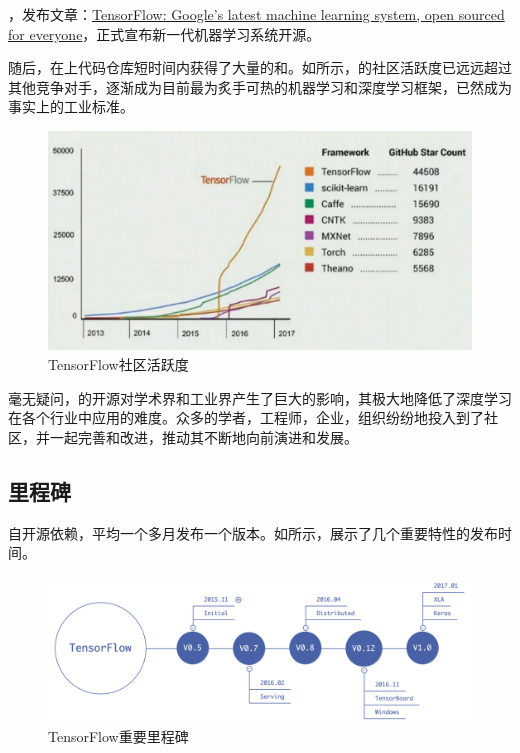 \begin{content}

，发布文章：\href{https://research.googleblog.com/2015/11/tensorflow-googles-latest-machine\_9.html}{TensorFlow: Google's latest machine learning system, open sourced for everyone}，正式宣布新一代机器学习系统开源。

随后，在上代码仓库短时间内获得了大量的和。如所示，的社区活跃度已远远超过其他竞争对手，逐渐成为目前最为炙手可热的机器学习和深度学习框架，已然成为事实上的工业标准。

\begin{figure}[!htbp]
\centering
\includegraphics[width=1.0\textwidth]{figures/tf-commits.png}
\caption{TensorFlow社区活跃度}
 \label{fig:tf-commits}
\end{figure}

毫无疑问，的开源对学术界和工业界产生了巨大的影响，其极大地降低了深度学习在各个行业中应用的难度。众多的学者，工程师，企业，组织纷纷地投入到了社区，并一起完善和改进，推动其不断地向前演进和发展。

\end{content}

\subsection{里程碑}

\begin{content}

\tf{}自开源依赖，平均一个多月发布一个版本。如所示，展示了\tf{}几个重要特性的发布时间。

\begin{figure}[!htbp]
\centering
\includegraphics[width=1.0\textwidth]{figures/tf-versions.png}
\caption{TensorFlow重要里程碑}
 \label{fig:tf-versions}
\end{figure}

\end{content}

